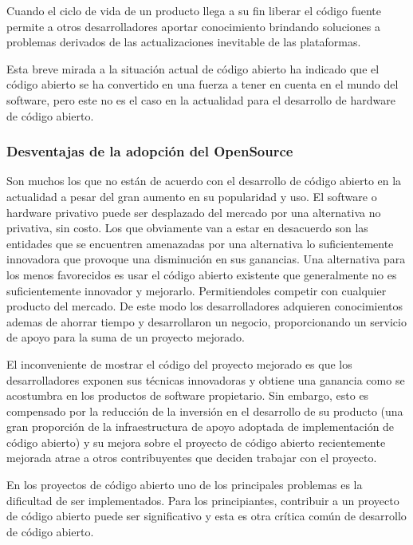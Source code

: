 Cuando el ciclo de vida de un producto llega a su fin liberar el código fuente permite a otros desarrolladores aportar conocimiento brindando soluciones a problemas derivados de las actualizaciones inevitable de las plataformas. 

Esta breve mirada a la situación actual de código abierto ha indicado que el código abierto se ha convertido en una fuerza a tener en cuenta en el mundo del software, pero este no es el caso en la actualidad para el desarrollo de hardware de código abierto.



\subsubsection{Desventajas de la adopción del OpenSource}

Son muchos los que no están de acuerdo con el desarrollo de código abierto en la actualidad a pesar del gran aumento en su popularidad y uso. El software o hardware privativo puede ser desplazado del mercado por una alternativa no privativa, sin costo. Los que obviamente van a estar en desacuerdo son las entidades que se encuentren amenazadas por una alternativa lo suficientemente innovadora que provoque una disminución en sus ganancias. Una alternativa para los menos favorecidos es usar el código abierto existente que generalmente no es suficientemente innovador y mejorarlo. Permitiendoles competir con cualquier producto del mercado. De este modo los desarrolladores adquieren conocimientos ademas de ahorrar tiempo y desarrollaron un negocio, proporcionando un servicio de apoyo para la suma de un proyecto mejorado.


El inconveniente de mostrar el código del proyecto mejorado es que los desarrolladores exponen sus técnicas innovadoras y obtiene una ganancia como se acostumbra en los productos de software propietario. Sin embargo, esto es compensado por la reducción de la inversión en el desarrollo de su producto (una gran proporción de
la infraestructura de apoyo adoptada de implementación de código abierto) y su mejora sobre el proyecto de código abierto recientemente mejorada atrae a otros contribuyentes que deciden trabajar con el proyecto.

En los proyectos de código abierto uno de los principales problemas es la dificultad de ser implementados. Para los principiantes, contribuir a un proyecto de código abierto puede
ser significativo y esta es otra crítica común de desarrollo de código abierto.



